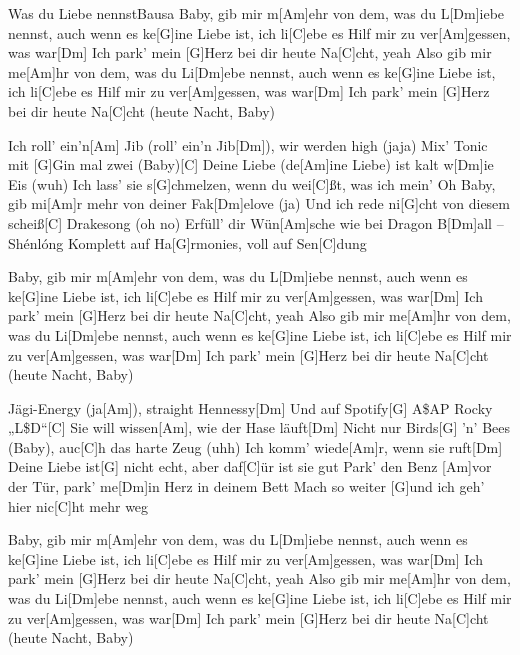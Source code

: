 \documentclass[../main.tex]{subfiles}
\begin{document}
\begin{song}{Was du Liebe nennst}{Bausa}{}
Baby, gib mir m[Am]ehr von dem, was du L[Dm]iebe nennst, auch wenn es ke[G]ine Liebe ist, ich li[C]ebe es
Hilf mir zu ver[Am]gessen, was war[Dm]{\hh}
Ich park' mein [G]Herz bei dir heute Na[C]cht, yeah
Also gib mir me[Am]hr von dem, was du Li[Dm]ebe nennst, auch wenn es ke[G]ine Liebe ist, ich li[C]ebe es
Hilf mir zu ver[Am]gessen, was war[Dm]{\hh}
Ich park' mein [G]Herz bei dir heute Na[C]cht (heute Nacht, Baby)

Ich roll' ein'n[Am] Jib (roll' ein'n Jib[Dm]), wir werden high (jaja)
Mix' Tonic mit [G]Gin mal zwei (Baby)[C]{\hh}
Deine Liebe (de[Am]ine Liebe) ist kalt w[Dm]ie Eis (wuh)
Ich lass' sie s[G]chmelzen, wenn du wei[C]{ß}t, was ich mein'
Oh Baby, gib mi[Am]r mehr von deiner Fak[Dm]elove (ja)
Und ich rede ni[G]cht von diesem scheiß[C] Drakesong (oh no)
Erfüll' dir Wün[Am]sche wie bei Dragon B[Dm]all – Shénlóng
Komplett auf Ha[G]rmonies, voll auf Sen[C]dung

Baby, gib mir m[Am]ehr von dem, was du L[Dm]iebe nennst, auch wenn es ke[G]ine Liebe ist, ich li[C]ebe es
Hilf mir zu ver[Am]gessen, was war[Dm]{\hh}
Ich park' mein [G]Herz bei dir heute Na[C]cht, yeah
Also gib mir me[Am]hr von dem, was du Li[Dm]ebe nennst, auch wenn es ke[G]ine Liebe ist, ich li[C]ebe es
Hilf mir zu ver[Am]gessen, was war[Dm]{\hh}
Ich park' mein [G]Herz bei dir heute Na[C]cht (heute Nacht, Baby)

Jägi-Energy (ja[Am]), straight Hennessy[Dm]{\hh}
Und auf Spotify[G] A\$AP Rocky „L\$D“[C]{\hh}
Sie will wissen[Am], wie der Hase läuft[Dm]{\hh}
Nicht nur Birds[G] 'n' Bees (Baby), auc[C]h das harte Zeug (uhh)
Ich komm' wiede[Am]r, wenn sie ruft[Dm]{\hh}
Deine Liebe ist[G] nicht echt, aber daf[C]{ü}r ist sie gut
Park' den Benz [Am]vor der Tür, park' me[Dm]in Herz in deinem Bett
Mach so weiter [G]und ich geh' hier nic[C]ht mehr weg

Baby, gib mir m[Am]ehr von dem, was du L[Dm]iebe nennst, auch wenn es ke[G]ine Liebe ist, ich li[C]ebe es
Hilf mir zu ver[Am]gessen, was war[Dm]{\hh}
Ich park' mein [G]Herz bei dir heute Na[C]cht, yeah
Also gib mir me[Am]hr von dem, was du Li[Dm]ebe nennst, auch wenn es ke[G]ine Liebe ist, ich li[C]ebe es
Hilf mir zu ver[Am]gessen, was war[Dm]{\hh}
Ich park' mein [G]Herz bei dir heute Na[C]cht (heute Nacht, Baby)
\end{song}
\end{document}

